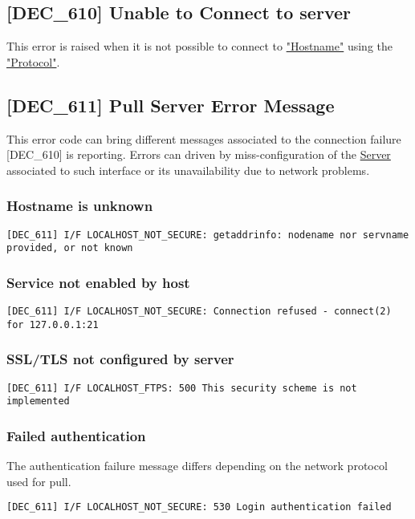 \documentclass[dec_sum_main.tex]{subfiles}
\begin{document}
\label{DEC610}
\subsection{[DEC\_610] Unable to Connect to server}
This error is raised when it is not possible to connect to \hyperref[Config_Server]{"Hostname"} using the \hyperref[Config_Server]{"Protocol"}.

\subsection{[DEC\_611] Pull Server Error Message}
\label{DEC611}
This error code can bring different messages associated to the connection failure [DEC\_610] is reporting. Errors can driven by miss-configuration of the \hyperref[Config_Server]{Server} associated to such interface or its unavailability due to network problems.

\subsubsection{Hostname is unknown}
\begin{verbatim}
[DEC_611] I/F LOCALHOST_NOT_SECURE: getaddrinfo: nodename nor servname provided, or not known
\end{verbatim}

\subsubsection{Service not enabled by host}
\begin{verbatim}
[DEC_611] I/F LOCALHOST_NOT_SECURE: Connection refused - connect(2) for 127.0.0.1:21
\end{verbatim}

\subsubsection{SSL/TLS not configured by server}
\begin{verbatim}
[DEC_611] I/F LOCALHOST_FTPS: 500 This security scheme is not implemented
\end{verbatim}

\subsubsection{Failed authentication}
The authentication failure message differs depending on the network protocol used for pull.
\begin{verbatim}
[DEC_611] I/F LOCALHOST_NOT_SECURE: 530 Login authentication failed
\end{verbatim}
\end{document}
